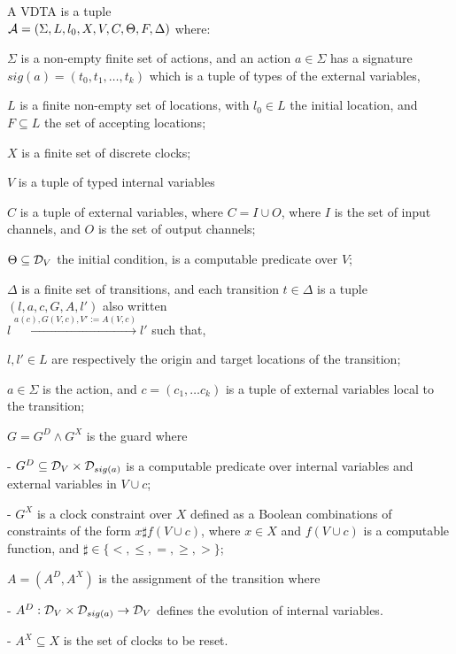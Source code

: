 %
\begin{definition}
	\label{def:vdta}
	A {VDTA} is a tuple \\
	${\mathcal A} = \left(\Sigma, L, {l_0}, X, V, C, \Theta, F,  \Delta \right)$ where:
	\squishlist
	\item $\Sigma$ is a non-empty finite set of actions,
	and an action $a \in \Sigma$ has a signature $sig(a) = ( t_0, t_1, \ldots, t_k )$ which is a tuple of types of the external variables,
	\item $L$ is a finite non-empty set of locations, with $l_0 \in L$ the initial location, and $F \subseteq L$ the set of accepting locations;
	\item $X$ is a finite set of discrete clocks;
	\item $V$ is a tuple of typed internal variables \item $C$ is a tuple of external variables, where $C = I \cup O$, where $I$ is the set of input channels, and $O$ is the set of output channels; 
	\item $\Theta\subseteq {\cal D}_{V }$ the initial condition, is a computable predicate over $V$;
	\item $\Delta$ is a finite set of transitions, and each transition $t \in \Delta$ is a tuple $( l, a, c, G, A, l' )$
	also written\\
	$l \xrightarrow{a(c), G(V,c), V':=A(V,c)} l'$
	such that,
	\squishlist
	\item[\textbullet] $l, l' \in L$ are respectively the origin and target locations of the transition;
	\item[\textbullet] $a \in \Sigma$ is the action, and $c=( c_1, \ldots c_k )$ is a tuple of external variables local to the transition;
	\item[\textbullet] $G = G^D \wedge G^X$ is the guard where
	\squishlist
	\item[-] $G^D \subseteq {\cal D}_V \times {\cal D}_{sig(a)}$
	is a computable predicate over internal variables and external variables  in $V \cup c$;
	\item[-] $G^X$ is a clock constraint over $X$ defined as a Boolean combinations of constraints of the form $x \sharp f(V \cup c)$, where $x \in X$ and $f(V \cup c)$ is a computable function, and $\sharp \in \{ <, \leq, =, \geq, > \}$;
	\squishend
	\item[\textbullet] $A$$=$$(A^D, A^X)$ is the assignment of the transition where
	\squishlist
	\item[-] $A^D :{\cal D}_V \times {\cal D}_{sig(a)} \rightarrow {\cal D}_V$ defines the evolution of internal variables.
	\item[-] $A^X \subseteq X$ is the set of clocks to be reset.
	\squishend
	\squishend
	\squishend
\end{definition}
%

